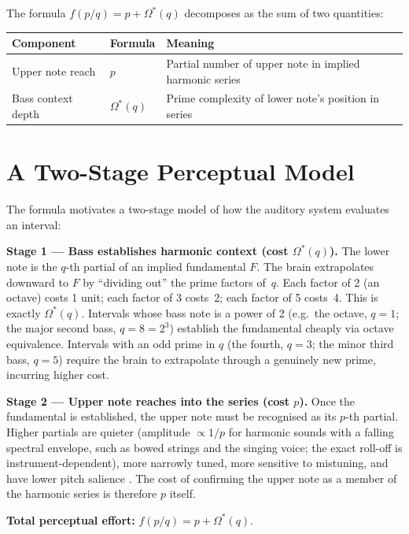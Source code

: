 \documentclass[11pt,a4paper]{article}
\newcommand{\Os}{\Omega^{*}}
\begin{document}
\medskip
\noindent The formula $f(p/q) = p + \Os(q)$ decomposes as the sum of two
quantities:

\medskip
\begin{tabular}{lll}
\toprule
Component & Formula & Meaning \\
\midrule
Upper note reach & $p$ & Partial number of upper note in implied harmonic series \\
Bass context depth & $\Os(q)$ & Prime complexity of lower note's position in series \\
\bottomrule
\end{tabular}


\section{A Two-Stage Perceptual Model}

The formula motivates a two-stage model of how the auditory system evaluates
an interval:

\medskip\noindent
\textbf{Stage 1 --- Bass establishes harmonic context (cost $\Os(q)$).}
The lower note is the $q$-th partial of an implied fundamental $F$. The brain
extrapolates downward to $F$ by ``dividing out'' the prime factors of~$q$.
Each factor of 2 (an octave) costs 1 unit; each factor of 3 costs~2; each
factor of 5 costs~4. This is exactly $\Os(q)$. Intervals whose bass note is a
power of 2 (e.g.\ the octave, $q=1$; the major second bass, $q=8=2^3$)
establish the fundamental cheaply via octave equivalence. Intervals with an
odd prime in $q$ (the fourth, $q=3$; the minor third bass, $q=5$) require the
brain to extrapolate through a genuinely new prime, incurring higher cost.

\medskip\noindent
\textbf{Stage 2 --- Upper note reaches into the series (cost $p$).}
Once the fundamental is established, the upper note must be recognised as its
$p$-th partial. Higher partials are quieter (amplitude $\propto 1/p$ for
harmonic sounds with a falling spectral envelope, such as bowed strings and
the singing voice; the exact roll-off is instrument-dependent), more narrowly
tuned, more sensitive to mistuning, and have lower pitch salience
\cite{terhardt1979}. The cost of confirming the upper note as a member of the
harmonic series is therefore $p$ itself.

\medskip\noindent
\textbf{Total perceptual effort:} $f(p/q) = p + \Os(q)$.
\end{document}

